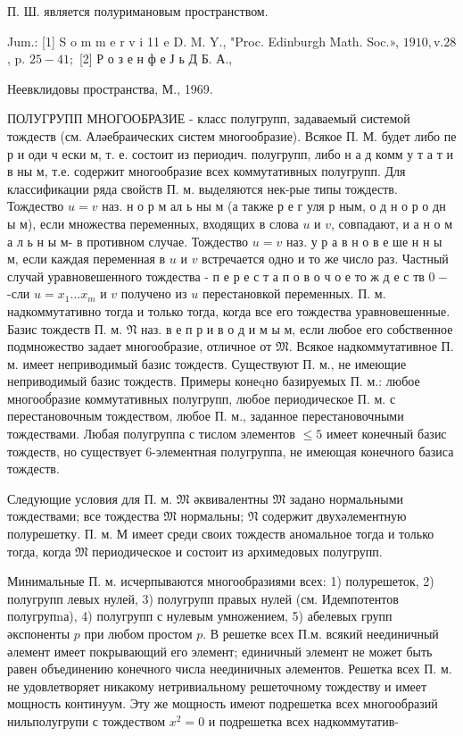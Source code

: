 \documentclass[10pt]{article}
\begin{document}
П. Ш. является полуримановым пространством.



Jum.: [1] S o m m e r v i 11 e D. M. Y., "Proc. Edinburgh Math. Soc.», $1910, \mathrm{v} .28$, p. $25-41 ;$ [2] Р о з е н ф е Ј ь Д Б. А.,

Неевклидовы пространства, М., 1969.



ПОЛУГРУПП МНОГООБРАЗИЕ - класс полугрупп, задаваемый системой тождеств (см. Аләебраических систем многообразие). Всякое П. М. будет либо пе р и оди ч ески м, т. е. состоит из периодич. полугрупп, либо н а д комм у т а т и в ны м, т.е. содержит многообразие всех коммутативных полугрупп. Для классификации ряда свойств П. м. выделяются нек-рые типы тождеств. Тождество $u=v$ наз. н о р м ал ь ны м (а также р е г уля р ным, о д н о р о дн ы м), если множества переменных, входящих в слова $u$ и $v$, совпадают, и а н о м а л ь н ы м- в противном случае. Тождество $u=v$ наз. у р а в н о в е ше н н ы м, если каждая переменная в $u$ и $v$ встречается одно и то же число раз. Частный случай уравновешенного тождества - п е р е с т а п о в о ч о е то ж д е с тв $0-$-сли $u=x_{1} \ldots x_{m}$ и $v$ получено из $u$ перестановкой переменных. П. м. надкоммутативно тогда и только тогда, когда все его тождества уравновешенные. Базис тождеств П. м. $\mathfrak{N}$ наз. в е п р и в о д и м ы м, если любое его собственное подмножество задает многообразие, отличное от $\mathfrak{M}$. Всякое надкоммутативное П. м. имеет неприводимый базис тождеств. Существуют П. м., не имеющие неприводимый базис тождеств. Примеры конеqно базируемых П. м.: любое многооб́разие коммутативных полугрупп, любое периодическое П. м. с перестановочным тождеством, любое П. м., заданное перестановочными тождествами. Любая полугруппа с тислом элементов $\leqslant 5$ имеет конечный базис тождеств, но существует 6-элементная полугруппа, не имеющая конечного базиса тождеств.



Следующие условия для П. м. $\mathfrak{M}$ әквивалентны $\mathfrak{M}$ задано нормальными тождествами; все тождества $\mathfrak{M}$ нормальны; $\mathfrak{N}$ содержит двухәлементную полурешетку. П. м. М имеет среди своих тождеств аномальное тогда и только тогда, когда $\mathfrak{M}$ периодическое и состоит из архимедовых полугрупп.



Минимальные П. м. исчерпываются многообразиями всех: 1) полурешеток, 2) полугрупп левых нулей, 3) полугрупп правых нулей (см. Идемпотентов полугрупnа), 4) полугрупп с нулевым умножением, 5) абелевых групп әкспоненты $p$ при любом простом $p$. В решетке всех П.м. всякий неединичный әлемент имеет покрывающий его элемент; единичный элемент не может быть равен объединению конечного числа неединичных әлементов. Решетка всех П. м. не удовлетворяет никакому нетривиальному решеточному тождеству и имеет мощность континуум. Эту же мощность имеют подрешетка всех многообразий нильполугрупи с тождеством $x^{2}=0$ и подрешетка всех надкоммутатив-
\end{document}
